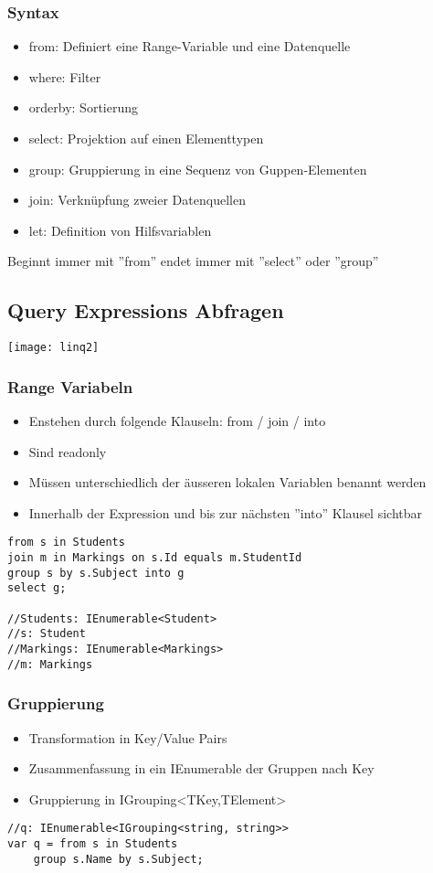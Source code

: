 \begin{multicols*}{2}
\subsubsection{Syntax}
\begin{itemize}
    \item from: Definiert eine Range-Variable und eine Datenquelle
    \item where: Filter
    \item orderby: Sortierung
    \item select: Projektion auf einen Elementtypen
    \item group: Gruppierung in eine Sequenz von Guppen-Elementen
    \item join: Verknüpfung zweier Datenquellen
    \item let: Definition von Hilfsvariablen
\end{itemize}
 Beginnt immer mit ''from'' endet immer mit ''select'' oder ''group''

\subsection{Query Expressions Abfragen}
\texttt{[image: linq2]}
\subsubsection{Range Variabeln}
\begin{itemize}
    \item Enstehen durch folgende Klauseln: from / join / into
    \item Sind readonly
    \item Müssen unterschiedlich der äusseren lokalen Variablen benannt werden
    \item Innerhalb der Expression und bis zur nächsten ''into'' Klausel sichtbar
\end{itemize}
\begin{lstlisting}
from s in Students
join m in Markings on s.Id equals m.StudentId 
group s by s.Subject into g
select g;

//Students: IEnumerable<Student>
//s: Student
//Markings: IEnumerable<Markings> 
//m: Markings
\end{lstlisting}
\subsubsection{Gruppierung}
\begin{itemize}
    \item Transformation in Key/Value Pairs
    \item Zusammenfassung in ein IEnumerable der Gruppen nach Key
    \item Gruppierung in IGrouping<TKey,TElement>
\end{itemize}
\begin{lstlisting}
//q: IEnumerable<IGrouping<string, string>>
var q = from s in Students
    group s.Name by s.Subject;  


\end{lstlisting}
\end{multicols*}

